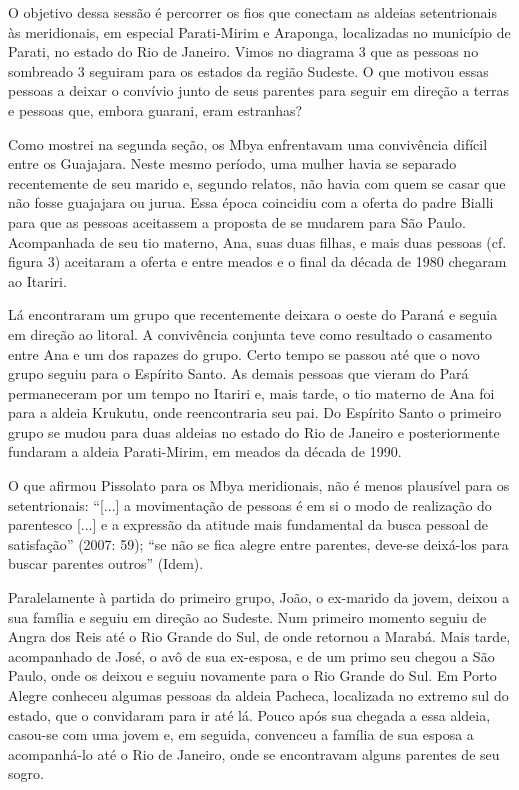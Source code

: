 \documentclass{article}
\begin{document}
O objetivo dessa sess\~ao \'e percorrer os fios que conectam as aldeias
setentrionais \`as meridionais, em especial Parati-Mirim e Araponga,
localizadas no munic\'ipio de Parati, no estado do Rio de Janeiro.
Vimos no diagrama 3 que as pessoas no sombreado 3 seguiram para os
estados da regi\~ao Sudeste. O que motivou essas pessoas a deixar o
conv\'ivio junto de seus parentes para seguir em dire\c{c}\~ao a terras
e pessoas que, embora guarani, eram estranhas?

Como mostrei na segunda se\c{c}\~ao, os Mbya enfrentavam uma
conviv\^encia dif\'icil entre os Guajajara. Neste mesmo per\'iodo, uma
mulher havia se separado recentemente de seu marido e, segundo relatos,
n\~ao havia com quem se casar que n\~ao fosse guajajara ou jurua. Essa
\'epoca coincidiu com a oferta do padre Bialli para que as pessoas
aceitassem a proposta de se mudarem para S\~ao Paulo. Acompanhada de
seu tio materno, Ana, suas duas filhas, e mais duas pessoas (cf. figura
3) aceitaram a oferta e entre meados e o final da d\'ecada de 1980
chegaram ao Itariri.

L\'a encontraram um grupo que recentemente deixara o oeste do Paran\'a e
seguia em dire\c{c}\~ao ao litoral. A conviv\^encia conjunta teve como
resultado o casamento entre Ana e um dos rapazes do grupo. Certo tempo
se passou at\'e que o novo grupo seguiu para o Esp\'irito Santo. As
demais pessoas que vieram do Par\'a permaneceram por um tempo no
Itariri e, mais tarde, o tio materno de Ana foi para a aldeia Krukutu,
onde reencontraria seu pai. Do Esp\'irito Santo o primeiro grupo se
mudou para duas aldeias no estado do Rio de Janeiro e posteriormente
fundaram a aldeia Parati-Mirim, em meados da d\'ecada de 1990.

O que afirmou Pissolato para os Mbya meridionais, n\~ao \'e menos
plaus\'ivel para os setentrionais: {\textquotedblleft}[...] a
movimenta\c{c}\~ao de pessoas \'e em si o modo de realiza\c{c}\~ao do
parentesco [...] e a express\~ao da atitude mais fundamental da busca
pessoal de satisfa\c{c}\~ao{\textquotedblright} (2007: 59);
{\textquotedblleft}se n\~ao se fica alegre entre parentes, deve-se
deix\'a-los para buscar parentes outros{\textquotedblright} (Idem).

Paralelamente \`a partida do primeiro grupo, Jo\~ao, o ex-marido da
jovem, deixou a sua fam\'ilia e seguiu em dire\c{c}\~ao ao Sudeste. Num
primeiro momento seguiu de Angra dos Reis at\'e o Rio Grande do Sul, de
onde retornou a Marab\'a. Mais tarde, acompanhado de Jos\'e, o av\^o de
sua ex-esposa, e de um primo seu chegou a S\~ao Paulo, onde os deixou e
seguiu novamente para o Rio Grande do Sul. Em Porto Alegre conheceu
algumas pessoas da aldeia Pacheca, localizada no extremo sul do estado,
que o convidaram para ir at\'e l\'a. Pouco ap\'os sua chegada a essa
aldeia, casou-se com uma jovem e, em seguida, convenceu a fam\'ilia de
sua esposa a acompanh\'a-lo at\'e o Rio de Janeiro, onde se encontravam
alguns parentes de seu sogro.
\end{document}
